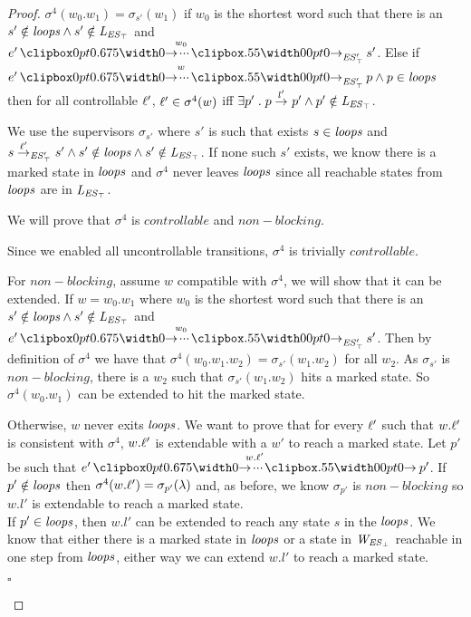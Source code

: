 \begin{proof}
$\sigma^4(w_0.w_1) = \sigma_{s'}(w_1)$ if $w_0$ is the shortest word such that there is an $s' \notin \mathit{loops} \wedge s'\notin \mathit{L_{\mathit{\mathit{ES}_{\top}}}}$ and $e' \runw{w_0}{\unexploredToTop{\structure'}} s'$.
Else if $e' \runw{w}{\unexploredToTop{\structure'}} p \wedge p \in \SCC$ then for all controllable $\ell'$, $\ell' \in\sigma^4(w)$ iff $\exists  p' \;.\; p \overset{l'}{\rightarrow}_{} p' \wedge p' \notin \mathit{L_{\mathit{\mathit{ES}_{\top}}}}$.

We use the supervisors $\sigma_{s'}$ where $s'$ is such that exists $s \in \mathit{loops}$ and $s\overset{\ell'}{\rightarrow}_{\mathit{\mathit{ES}'_{\top}}} s'\wedge s' \notin \mathit{loops} \wedge s'\notin \mathit{L_{\mathit{\mathit{ES}_{\top}}}}$. If none such $s'$ exists, we know there is a marked state in $\mathit{loops}$ and $\sigma^4$ never leaves $\mathit{loops}$ since all reachable states from $\mathit{loops}$ are in $\mathit{L_{\mathit{\mathit{ES}_{\top}}}}$.



We will prove that $\sigma^4$ is $controllable$ and $non-blocking$.

Since we enabled all uncontrollable transitions, $\sigma^4$ is trivially $controllable$.

For $non-blocking$, assume $w$ compatible with $\sigma^4$, we will show that it can be extended. If $w = w_0.w_1$ where $w_0$ is the shortest word such that there is an $s' \notin \mathit{loops} \wedge s' \notin \mathit{L_{\mathit{\mathit{ES}_{\top}}}}$ and $e' \runw{w_0}{\unexploredToTop{\structure'}} s'$. Then by definition of $\sigma^4$ we have that $\sigma^4(w_0.w_1.w_2) = \sigma_{s'}(w_1.w_2)$ for all $w_2$. As $\sigma_{s'}$ is $non-blocking$, there is a $w_2$ such that $\sigma_{s'}(w_1.w_2)$ hits a marked state. So $\sigma^4(w_0.w_1)$ can be extended to hit the marked state. 

Otherwise, $w$ never exits $\mathit{loops}$. We want to prove that for every $\ell'$ such that $w.\ell'$ is consistent with $\sigma^4$, $w.\ell'$ is extendable with a $w'$ to reach a marked state. Let $p'$ be such that $e' \runw{w.\l'}{} p'$. If $p' \notin \mathit{loops}$ then $\sigma^4(w.\ell') = \sigma_{p'}(\lambda)$ and, as before, we know $\sigma_{p'}$ is $non-blocking$ so $w.l'$ is extendable to reach a marked state.\\
If $p' \in \mathit{loops}$, then  $w.l'$ can be extended to reach any state $s$ in the $\mathit{loops}$. We know that either there is a marked state in $\mathit{loops}$ or a state in $\mathit{W_{\mathit{\mathit{ES}_{\bot}}}}$ reachable in one step from $\mathit{loops}$, either way we can extend $w.l'$ to reach a marked state.\\
\begin{flushright}
	$\square$
\end{flushright}
\end{proof}


